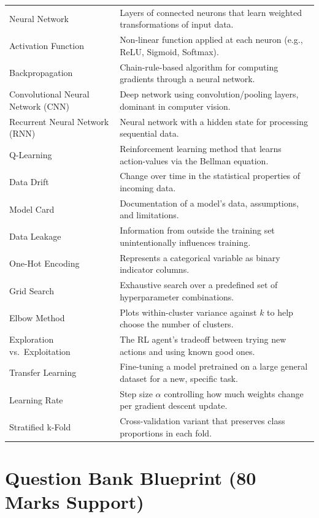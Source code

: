 \documentclass[11pt,a4paper]{article}
\begin{document}
\begin{longtable}{@{}p{3.3cm}p{10.2cm}@{}}
\addlinespace
Neural Network & Layers of connected neurons that learn weighted transformations of input data. \\
\addlinespace
Activation Function & Non-linear function applied at each neuron (e.g., ReLU, Sigmoid, Softmax). \\
\addlinespace
Backpropagation & Chain-rule-based algorithm for computing gradients through a neural network. \\
\addlinespace
Convolutional Neural Network (CNN) & Deep network using convolution/pooling layers, dominant in computer vision. \\
\addlinespace
Recurrent Neural Network (RNN) & Neural network with a hidden state for processing sequential data. \\
\addlinespace
Q-Learning & Reinforcement learning method that learns action-values via the Bellman equation. \\
\addlinespace
Data Drift & Change over time in the statistical properties of incoming data. \\
\addlinespace
Model Card & Documentation of a model's data, assumptions, and limitations. \\
\addlinespace
Data Leakage & Information from outside the training set unintentionally influences training. \\
\addlinespace
One-Hot Encoding & Represents a categorical variable as binary indicator columns. \\
\addlinespace
Grid Search & Exhaustive search over a predefined set of hyperparameter combinations. \\
\addlinespace
Elbow Method & Plots within-cluster variance against $k$ to help choose the number of clusters. \\
\addlinespace
Exploration vs.\ Exploitation & The RL agent's tradeoff between trying new actions and using known good ones. \\
\addlinespace
Transfer Learning & Fine-tuning a model pretrained on a large general dataset for a new, specific task. \\
\addlinespace
Learning Rate & Step size $\alpha$ controlling how much weights change per gradient descent update. \\
\addlinespace
Stratified k-Fold & Cross-validation variant that preserves class proportions in each fold. \\
\bottomrule
\end{longtable}

\section{Question Bank Blueprint (80 Marks Support)}
\end{document}

